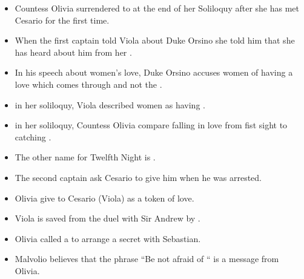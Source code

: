 \documentclass[12pt, a4paper]{article}
\begin{document}
\begin{itemize}
  \item[\ding{109}] Countess Olivia surrendered to  at the end of her Soliloquy after she has met Cesario for the first time.

  \item[\ding{109}] When the first captain told Viola about Duke Orsino she told him that she has heard about him from her .

  \item[\ding{109}] In his speech about women's love, Duke Orsino accuses women of having a love which comes through  and not the .

  \item[\ding{109}] in her soliloquy, Viola described women as having .

  \item[\ding{109}] in her soliloquy, Countess Olivia compare falling in love from fist sight to catching .

  \item[\ding{109}] The other name for Twelfth Night is .

  \item[\ding{109}]  The second captain ask Cesario to give him  when he was arrested.
                                                                                                       
  \item[\ding{109}]  Olivia give  to Cesario (Viola) as a token of love.
                                                                                                       
  \item[\ding{109}]  Viola is saved from the duel with Sir Andrew by .
                                                                                                       
  \item[\ding{109}]  Olivia called a  to arrange a secret  with Sebastian.
                                                                                                       
  \item[\ding{109}]  Malvolio believes that the phrase “Be not afraid of “ is a message from Olivia.  
                                                                                                       

\end{itemize}
\end{document}
